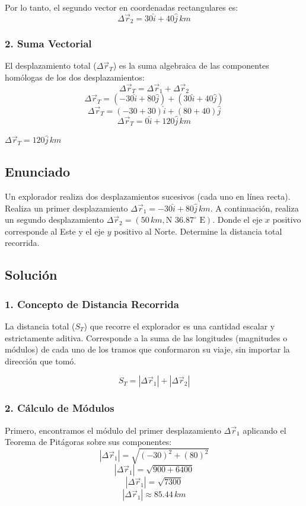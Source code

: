 \documentclass[12pt, a4paper]{article}
\begin{document}
Por lo tanto, el segundo vector en coordenadas rectangulares es:
$$ \Delta\vec{r}_2 = 30\hat{i} + 40\hat{j} \, \si{km} $$

\subsubsection*{2. Suma Vectorial}
El desplazamiento total ($\Delta\vec{r}_T$) es la suma algebraica de las componentes homólogas de los dos desplazamientos:
$$ \Delta\vec{r}_T = \Delta\vec{r}_1 + \Delta\vec{r}_2 $$
$$ \Delta\vec{r}_T = (-30\hat{i} + 80\hat{j}) + (30\hat{i} + 40\hat{j}) $$
$$ \Delta\vec{r}_T = (-30 + 30)\hat{i} + (80 + 40)\hat{j} $$
$$ \Delta\vec{r}_T = 0\hat{i} + 120\hat{j} \, \si{km} $$

\begin{tcolorbox}[colback=green!5!white, colframe=green!50!black, title=Respuesta Final]
\centering \Large $\Delta\vec{r}_T = 120\hat{j} \, \si{km}$
\end{tcolorbox}

\newpage

\subsection*{Enunciado}
Un explorador realiza dos desplazamientos sucesivos (cada uno en línea recta). Realiza un primer desplazamiento $\Delta\vec{r}_1 = -30\hat{i} + 80\hat{j} \, \si{km}$. A continuación, realiza un segundo desplazamiento $\Delta\vec{r}_2 = (50 \, \si{km}, \text{N } 36.87^\circ \text{ E})$. Donde el eje $x$ positivo corresponde al Este y el eje $y$ positivo al Norte. Determine la distancia total recorrida.

\subsection*{Solución}

\subsubsection*{1. Concepto de Distancia Recorrida}
La distancia total ($S_T$) que recorre el explorador es una cantidad escalar y estrictamente aditiva. Corresponde a la suma de las longitudes (magnitudes o módulos) de cada uno de los tramos que conformaron su viaje, sin importar la dirección que tomó.

$$ S_T = |\Delta\vec{r}_1| + |\Delta\vec{r}_2| $$

\subsubsection*{2. Cálculo de Módulos}
Primero, encontramos el módulo del primer desplazamiento $\Delta\vec{r}_1$ aplicando el Teorema de Pitágoras sobre sus componentes:
$$ |\Delta\vec{r}_1| = \sqrt{(-30)^2 + (80)^2} $$
$$ |\Delta\vec{r}_1| = \sqrt{900 + 6400} $$
$$ |\Delta\vec{r}_1| = \sqrt{7300} $$
$$ |\Delta\vec{r}_1| \approx 85.44 \, \si{km} $$
\end{document}
